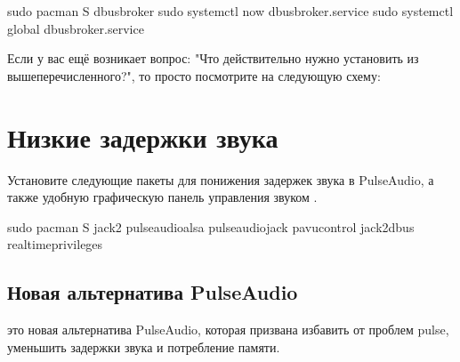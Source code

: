 \documentclass[letterpaper,10pt,russian,openany]{sphinxmanual}
\begin{document}
\begin{sphinxVerbatim}[commandchars=\\\{\}]
sudo pacman \PYGZhy{}S dbus\PYGZhy{}broker                         
sudo systemctl  \PYGZhy{}\PYGZhy{}now dbus\PYGZhy{}broker.service    
sudo systemctl \PYGZhy{}\PYGZhy{}global  dbus\PYGZhy{}broker.service 
\end{sphinxVerbatim}

\sphinxAtStartPar
Если у вас ещё возникает вопрос: "Что действительно нужно установить из вышеперечисленного?",
то просто посмотрите на следующую схему:

\noindent{}

\ignorespaces 

\section{Низкие задержки звука}
\label{\detokenize{source/generic-system-acceleration:lowlatency-audio}}\label{\detokenize{source/generic-system-acceleration:index-5}}\label{\detokenize{source/generic-system-acceleration:id4}}
\sphinxAtStartPar
Установите следующие пакеты для понижения задержек звука в PulseAudio,
а также удобную графическую панель управления звуком \sphinxhyphen{}  .

\begin{sphinxVerbatim}[commandchars=\\\{\}]
sudo pacman \PYGZhy{}S jack2 pulseaudio\PYGZhy{}alsa pulseaudio\PYGZhy{}jack pavucontrol jack2\PYGZhy{}dbus realtime\PYGZhy{}privileges
\end{sphinxVerbatim}

\ignorespaces 

\subsection{Новая альтернатива PulseAudio}
\label{\detokenize{source/generic-system-acceleration:pulseaudio}}\label{\detokenize{source/generic-system-acceleration:pipewire-installation}}\label{\detokenize{source/generic-system-acceleration:index-6}}
\sphinxAtStartPar
{} \sphinxhyphen{} это новая альтернатива PulseAudio,
которая призвана избавить от проблем pulse, уменьшить задержки звука и потребление памяти.
\end{document}
